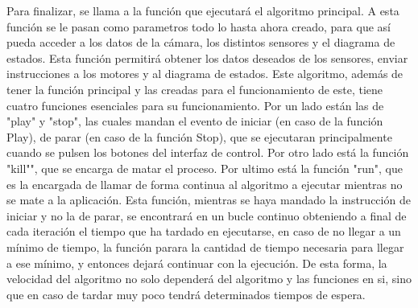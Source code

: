 \hspace{1 cm} Para finalizar, se llama a la funci\'on que ejecutar\'a el algoritmo principal. A esta funci\'on se le pasan como parametros todo lo hasta ahora creado, para que as\'i pueda acceder a los datos de la c\'amara, los distintos sensores y el diagrama de estados. Esta funci\'on permitir\'a obtener los datos deseados de los sensores, enviar instrucciones a los motores y al diagrama de estados. Este algoritmo, adem\'as de tener la funci\'on principal y las creadas para el funcionamiento de este, tiene cuatro funciones esenciales para su funcionamiento. Por un lado est\'an las de "play" y "stop", las cuales mandan el evento de iniciar (en caso de la funci\'on Play), de parar (en caso de la funci\'on Stop), que se ejecutaran principalmente cuando se pulsen los botones del interfaz de control. Por otro lado est\'a la funci\'on "kill"", que se encarga de matar el proceso. Por ultimo est\'a la funci\'on "run", que es la encargada de llamar de forma continua al algoritmo a ejecutar mientras no se mate a la aplicaci\'on. Esta funci\'on, mientras se haya mandado la instrucci\'on de iniciar y no la de parar, se encontrar\'a en un bucle continuo obteniendo a final de cada iteraci\'on el tiempo que ha tardado en ejecutarse, en caso de no llegar a un m\'inimo de tiempo, la funci\'on parara la cantidad de tiempo necesaria para llegar a ese m\'inimo, y entonces dejar\'a continuar con la ejecuci\'on. De esta forma, la velocidad del algoritmo no solo depender\'a del algoritmo y las funciones en si, sino que en caso de tardar muy poco tendr\'a determinados tiempos de espera.

















